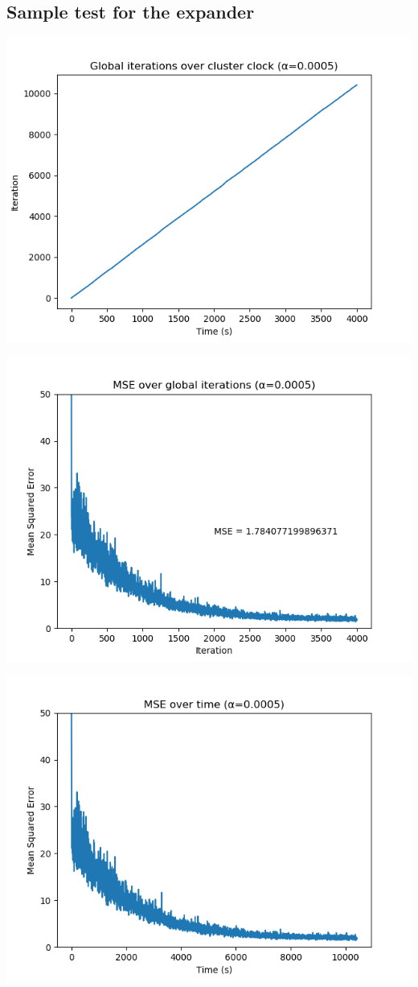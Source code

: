 \documentclass[a4paper,12pt]{article}
\theoremstyle{newplanestyle}
\theoremstyle{newdefinitionstyle}
\theoremstyle{newprovestyle}
\begin{document}
\subsection*{Sample test for the expander}
\includegraphics[scale=0.6]{iter_time_expander}

\includegraphics[scale=0.6]{mse_iter_expander}

\includegraphics[scale=0.6]{mse_time_expander}
\end{document}
